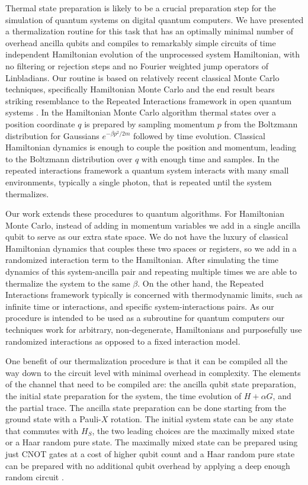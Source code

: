 \documentclass[
 amsmath,amssymb,
 aps,
onecolumn, 
nofootinbib]{revtex4-2}
\begin{document}
Thermal state preparation is likely to be a crucial preparation step for the simulation of quantum systems on digital quantum computers. We have presented a thermalization routine for this task that has an optimally minimal number of overhead ancilla qubits and compiles to remarkably simple circuits of time independent Hamiltonian evolution of the unprocessed system Hamiltonian, with no filtering or rejection steps and no Fourier weighted jump operators of Linbladians. Our routine is based on relatively recent classical Monte Carlo techniques, specifically Hamiltonian Monte Carlo \cite{hoffman2011nouturnsampleradaptivelysetting} and the end result bears striking resemblance to the Repeated Interactions framework in open quantum systems \cite{prositto2025equilibrium}. In the Hamiltonian Monte Carlo algorithm thermal states over a position coordinate $q$ is prepared by sampling momentum $p$ from the Boltzmann distribution for Gaussians $e^{-\beta p^2/2m}$ followed by time evolution. Classical Hamiltonian dynamics is enough to couple the position and momentum, leading to the Boltzmann distribution over $q$ with enough time and samples. In the repeated interactions framework a quantum system interacts with many small environments, typically a single photon, that is repeated until the system thermalizes. 

Our work extends these procedures to quantum algorithms. For Hamiltonian Monte Carlo, instead of adding in momentum variables we add in a single ancilla qubit to serve as our extra state space. We do not have the luxury of classical Hamiltonian dynamics that couples these two spaces or registers, so we add in a randomized interaction term to the Hamiltonian. After simulating the time dynamics of this system-ancilla pair and repeating multiple times we are able to thermalize the system to the same $\beta$. On the other hand, the Repeated Interactions framework typically is concerned with thermodynamic limits, such as infinite time or interactions, and specific system-interactions pairs. As our procedure is intended to be used as a subroutine for quantum computers our techniques work for arbitrary, non-degenerate, Hamiltonians and purposefully use randomized interactions as opposed to a fixed interaction model.

One benefit of our thermalization procedure is that it can be compiled all the way down to the circuit level with minimal overhead in complexity. The elements of the channel that need to be compiled are: the ancilla qubit state preparation, the initial state preparation for the system, the time evolution of $H + \alpha G$, and the partial trace. The ancilla state preparation can be done starting from the ground state with a Pauli-$X$ rotation. The initial system state can be any state that commutes with $H_S$, the two leading choices are the maximally mixed state or a Haar random pure state. The maximally mixed state can be prepared using just CNOT gates at a cost of higher qubit count and a Haar random pure state can be prepared with no additional qubit overhead by applying a deep enough random circuit \cite{choi2023preparing}. 
\end{document}
